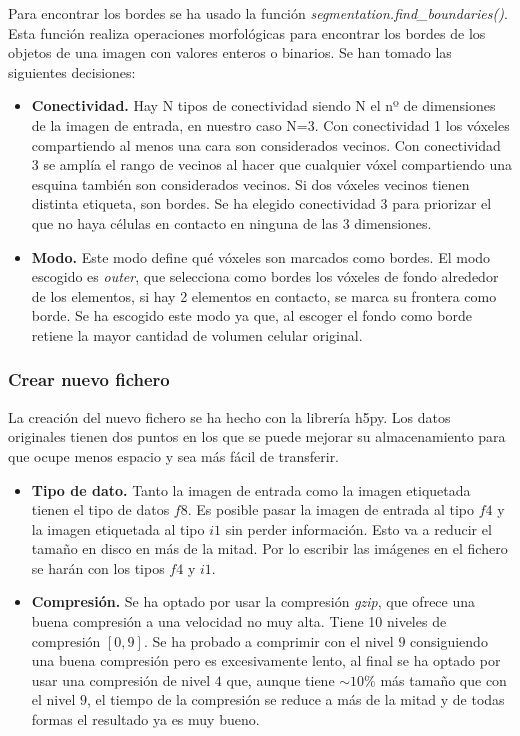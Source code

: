 Para encontrar los bordes se ha usado la función \textit{segmentation.find\_boundaries()}. Esta función realiza operaciones morfológicas para encontrar los bordes de los objetos de una imagen con valores enteros o binarios. Se han tomado las siguientes decisiones:
\begin{itemize}
\item \textbf{Conectividad.} Hay N tipos de conectividad siendo N el nº de dimensiones de la imagen de entrada, en nuestro caso N=3. Con conectividad 1 los vóxeles compartiendo al menos una cara son considerados vecinos. Con conectividad 3 se amplía el rango de vecinos al hacer que cualquier vóxel compartiendo una esquina también son considerados vecinos. Si dos vóxeles vecinos tienen distinta etiqueta, son bordes. Se ha elegido conectividad 3 para priorizar el que no haya células en contacto en ninguna de las 3 dimensiones.
\item \textbf{Modo.} Este modo define qué vóxeles son marcados como bordes. El modo escogido es \textit{outer}, que selecciona como bordes los vóxeles de fondo alrededor de los elementos, si hay 2 elementos en contacto, se marca su frontera como borde. Se ha escogido este modo ya que, al escoger el fondo como borde retiene la mayor cantidad de volumen celular original.
\end{itemize}

\subsubsection{Crear nuevo fichero}

La creación del nuevo fichero se ha hecho con la librería h5py. Los datos originales tienen dos puntos en los que se puede mejorar su almacenamiento para que ocupe menos espacio y sea más fácil de transferir.
\begin{itemize}
\item \textbf{Tipo de dato.} Tanto la imagen de entrada como la imagen etiquetada tienen el tipo de datos $f8$. Es posible pasar la imagen de entrada al tipo $f4$ y la imagen etiquetada al tipo $i1$ sin perder información. Esto va a reducir el tamaño en disco en más de la mitad. Por lo escribir las imágenes en el fichero se harán con los tipos $f4$ y $i1$.
\item \textbf{Compresión.} Se ha optado por usar la compresión \textit{gzip}, que ofrece una buena compresión a una velocidad no muy alta. Tiene 10 niveles de compresión $[0,9]$. Se ha probado a comprimir con el nivel $9$ consiguiendo una buena compresión pero es excesivamente lento, al final se ha optado por usar una compresión de nivel $4$ que, aunque tiene $\sim 10\%$ más tamaño que con el nivel $9$, el tiempo de la compresión se reduce a más de la mitad y de todas formas el resultado ya es muy bueno.
\end{itemize}

